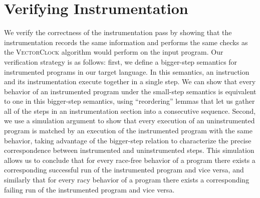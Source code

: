 \documentclass[preprint, 10pt]{sigplanconf}
\newcommand{\VCalg}{\textsc{VectorClock}\xspace}
\begin{document}
\section{Verifying Instrumentation}
\label{verification}
We verify the correctness of the instrumentation pass by showing that the instrumentation records the same information and performs the same checks as the \VCalg algorithm would perform on the input program. Our verification strategy is as follows: first, we define a bigger-step semantics for instrumented programs in our target language. In this semantics, an instruction and its instrumentation execute together in a single step. We can show that every behavior of an instrumented program under the small-step semantics is equivalent to one in this bigger-step semantics, using ``reordering'' lemmas that let us gather all of the steps in an instrumentation section into a consecutive sequence. Second, we use a simulation argument to show that every execution of an uninstrumented program is matched by an execution of the instrumented program with the same behavior, taking advantage of the bigger-step relation to characterize the precise correspondence between instrumented and uninstrumented steps. This simulation allows us to conclude that for every race-free behavior of a program there exists a corresponding successful run of the instrumented program and vice versa, and similarly that for every racy behavior of a program there exists a corresponding failing run of the instrumented program and vice versa.
\end{document}
